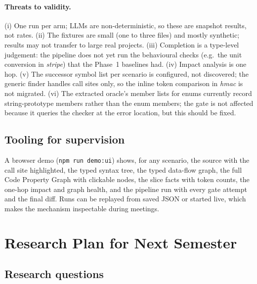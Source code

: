 \documentclass[11pt,a4paper]{article}
\newcommand{\code}[1]{\texttt{#1}}
\begin{document}
\paragraph{Threats to validity.}
(i) One run per arm; LLMs are non-deterministic, so these are snapshot results, not rates.
(ii) The fixtures are small (one to three files) and mostly synthetic; results may not transfer
to large real projects. (iii) Completion is a type-level judgement: the pipeline does not yet
run the behavioural checks (e.g.\ the unit conversion in \emph{stripe}) that the Phase~1
baselines had. (iv) Impact analysis is one hop. (v) The successor symbol list per scenario is
configured, not discovered; the generic finder handles call sites only, so the inline token
comparison in \emph{hmac} is not migrated. (vi) The extracted oracle's member lists for
enums currently record string-prototype members rather than the enum members; the gate is not
affected because it queries the checker at the error location, but this should be fixed.

\subsection{Tooling for supervision}

A browser demo (\code{npm run demo:ui}) shows, for any scenario, the source with the
call site highlighted, the typed syntax tree, the typed data-flow graph, the full Code
Property Graph with clickable nodes, the slice facts with token counts, the one-hop impact
and graph health, and the pipeline run with every gate attempt and the final diff. Runs can be
replayed from saved JSON or started live, which makes the mechanism inspectable during
meetings.

\section{Research Plan for Next Semester}
\label{sec:plan}

\subsection{Research questions}
\end{document}

